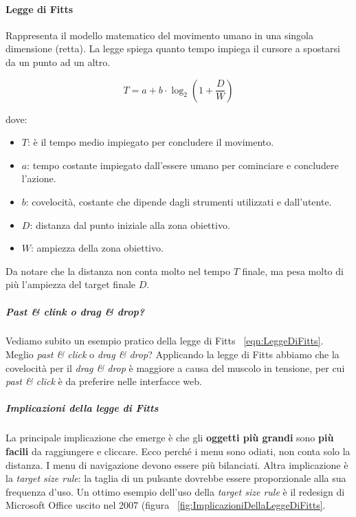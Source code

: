			\paragraph{Legge di Fitts}
				Rappresenta il modello matematico del movimento umano in una singola dimensione (retta). La legge spiega quanto tempo impiega il cursore a spostarsi da un punto ad un altro.
			
					\begin{equation}
						\label{eqn:LeggeDiFitts}
						T=a+b \cdot \log_2 (1+\frac{D}{W})
					\end{equation}
					
					dove:
					\begin{itemize}
						\item $T$: è il tempo medio impiegato per concludere il movimento.
						\item $a$: tempo costante impiegato dall'essere umano per cominciare e concludere l'azione.
						\item $b$: covelocità, costante che dipende dagli strumenti utilizzati e dall'utente.
						\item $D$: distanza dal punto iniziale alla zona obiettivo.
						\item $W$: ampiezza della zona obiettivo.
					\end{itemize}
					Da notare che la distanza non conta molto nel tempo $T$ finale, ma pesa molto di più l'ampiezza del target finale $D$.
			
				\subparagraph{Past \& clink o drag \& drop?}
					Vediamo subito un esempio pratico della legge di Fitts ~\ref{eqn:LeggeDiFitts}. Meglio \emph{past \& click} o \emph{drag \& drop}? Applicando la legge di Fitts abbiamo che la covelocità per il \emph{drag \& drop} è maggiore a causa del muscolo in tensione, per cui \emph{past \& click} è da preferire nelle interfacce web.
			
				\subparagraph{Implicazioni della legge di Fitts}
					La principale implicazione che emerge è che gli \textbf{oggetti più grandi} sono \textbf{più facili} da raggiungere e cliccare. Ecco perché i menu sono odiati, non conta solo la distanza. I menu di navigazione devono essere più bilanciati. Altra implicazione è la \emph{target size rule}: la taglia di un pulsante dovrebbe essere proporzionale alla sua frequenza d'uso. Un ottimo esempio dell'uso della \emph{target size rule} è il redesign di Microsoft Office uscito nel 2007 (figura ~\ref{fig:ImplicazioniDellaLeggeDiFitts}.
					
